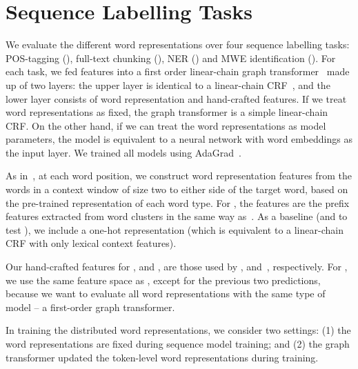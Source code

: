 \section{Sequence Labelling Tasks}
\label{sec:SeqTagging}

We evaluate the different word representations over four sequence
labelling tasks: POS-tagging (\pos), full-text chunking (\chunking),
NER (\ner) and MWE identification (\mwe). For
each task, we fed features into a first order linear-chain graph
transformer~\cite{collobert2011natural} made up of two layers: the upper
layer is identical to a linear-chain CRF~\cite{lafferty2001conditional},
and the lower layer consists of word representation and hand-crafted
features. If we treat word representations as fixed, the graph
transformer is a simple linear-chain CRF. On the other hand, if we can
treat the word representations as model parameters, the model is
equivalent to a neural network with word embeddings as the input
layer. We trained all models using AdaGrad~\cite{duchi2011adaptive}.




As in~, at each word position, we construct word
representation features from the words in a context window of size two
to either side of the target word, based on the pre-trained
representation of each word type.  For \brown, the features are the
prefix features extracted from word clusters in the same way
as~. As a baseline (and to test \RQ[1]), we include a one-hot
representation (which is equivalent to a linear-chain CRF with only
lexical context features).

Our hand-crafted features for \pos, \chunking and \mwe, are those used
by , 
and~, respectively. For \ner, we use the same feature
space as , except for the previous two
predictions, because we want to evaluate all word representations with
the same type of model -- a first-order graph transformer.

In training the distributed word representations, we consider two
settings: (1) the word representations are fixed during sequence model
training; and (2) the graph transformer updated the token-level word
representations during training.


